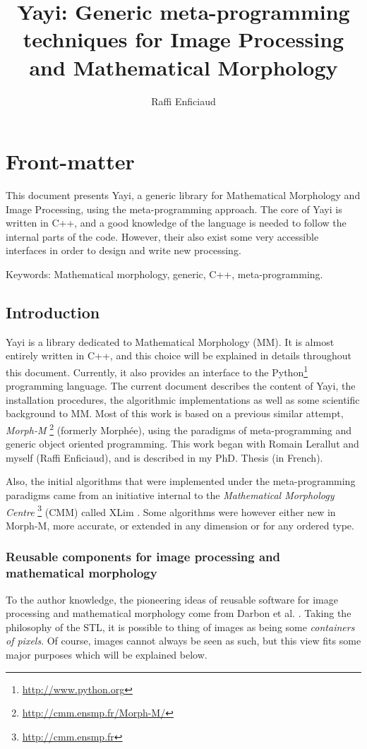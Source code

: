 \documentclass[a4paper, fleqn, 10pt]{book}
\title{Yayi: Generic meta-programming techniques for Image Processing and Mathematical Morphology}
\author{Raffi Enficiaud}
\theoremstyle{break}
\begin{document}

\maketitle

\part{Front-matter}
This document presents Yayi, a generic library for Mathematical Morphology and Image Processing, using the meta-programming approach. The core of Yayi is written in C++, and a good knowledge of the language is needed to follow the internal parts of the code. However, their also exist some very accessible interfaces in order to design and write new processing. 


Keywords: Mathematical morphology, generic, C++, meta-programming.

\clearpage 
\tableofcontents

\clearpage 
\listoffigures


\chapter{Introduction}
Yayi is a library dedicated to Mathematical Morphology (MM). It is almost entirely written in C++, and this choice will be explained in details throughout this document. Currently, it also provides an interface to the Python\footnote{\url{http://www.python.org}} programming language. The current document describes the content of Yayi, the installation procedures, the algorithmic implementations as well as some scientific background to MM. Most of this work is based on a previous similar attempt, \textit{Morph-M} \footnote{\url{http://cmm.ensmp.fr/Morph-M/}} (formerly Morphée), using the paradigms of meta-programming and generic object oriented programming. This work began with Romain Lerallut and myself (Raffi Enficiaud), and is described in my PhD. Thesis \cite{raffi:phd:2007} (in French). 

Also, the initial algorithms that were implemented under the meta-programming paradigms came from an initiative internal to the \textit{Mathematical Morphology Centre} \footnote{\url{http://cmm.ensmp.fr}} (CMM) called XLim \cite{xlim3D:web}. Some algorithms were however either new in Morph-M, more accurate, or extended in any dimension or for any ordered type. 

\section{Reusable components for image processing and mathematical morphology}
To the author knowledge, the pioneering ideas of reusable software for image processing and mathematical morphology come from Darbon et al. \cite{darbon:2002}. Taking the philosophy of the STL, it is possible to thing of images as being some \textit{containers of pixels}. Of course, images cannot always be seen as such, but this view fits some major purposes which will be explained below. 
\end{document}
